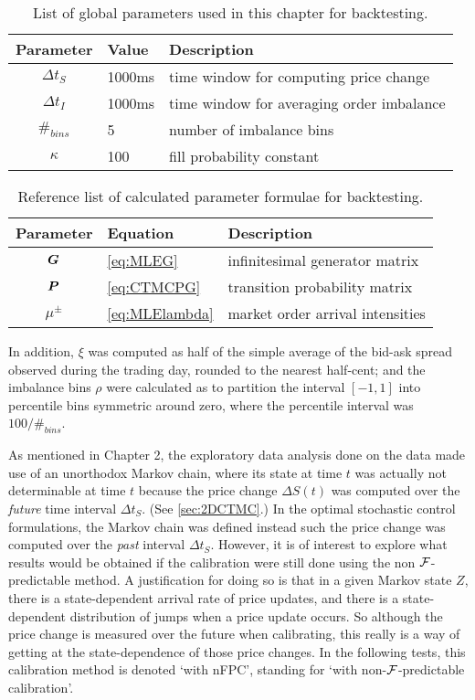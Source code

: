 \begin{table}
\centering%
%
\caption[Fixed parameters for backtesting]{List of global parameters used in this chapter for backtesting.}\label{tbl:globalparams}%
\begin{tabular}{cll}
\toprule
Parameter & Value & Description \\
\midrule
$\Delta t_S$ & 1000ms & time window for computing price change \\
$\Delta t_I$ & 1000ms & time window for averaging order imbalance \\
$\#_{bins}$ & 5 & number of imbalance bins \\
$\kappa$ & 100 & fill probability constant \\
\bottomrule
\end{tabular}
\end{table}

\begin{table}
\centering%
%
\caption[Parameter formulae for backtesting]{Reference list of calculated parameter formulae for backtesting.}\label{tbl:globalparamsformulae}%
\begin{tabular}{cll}
\toprule
Parameter & Equation & Description \\
\midrule
$\boldsymbol{G}$ & \autoref{eq:MLEG} & infinitesimal generator matrix \\
$\boldsymbol{P}$ & \autoref{eq:CTMCPG} & transition probability matrix \\
$\mu^\pm$ & \autoref{eq:MLElambda} & market order arrival intensities\\
\bottomrule
\end{tabular}
\end{table}

In addition, $\xi$ was computed as half of the simple average of the bid-ask spread observed during the trading day, rounded to the nearest half-cent; and the imbalance bins $\rho$ were calculated as to partition the interval $[-1,1]$ into percentile bins symmetric around zero, where the percentile interval was $100 / \#_{bins}$.

As mentioned in Chapter 2, the exploratory data analysis done on the data made use of an unorthodox Markov chain, where its state at time $t$ was actually not determinable at time $t$ because the price change $\Delta S(t)$ was computed over the \emph{future} time interval $\Delta t_S$. (See \autoref{sec:2DCTMC}.) In the optimal stochastic control formulations, the Markov chain was defined instead such the price change was computed over the \emph{past} interval $\Delta t_S$. However, it is of interest to explore what results would be obtained if the calibration were still done using the non $\mathcal{F}$-predictable method. A justification for doing so is that in a given Markov state $Z$, there is a state-dependent arrival rate of price updates, and there is a state-dependent distribution of jumps when a price update occurs. So although the price change is measured over the future when calibrating, this really is a way of getting at the state-dependence of those price changes. In the following tests, this calibration method is denoted `with nFPC', standing for `with non-$\mathcal{F}$-predictable calibration'.

